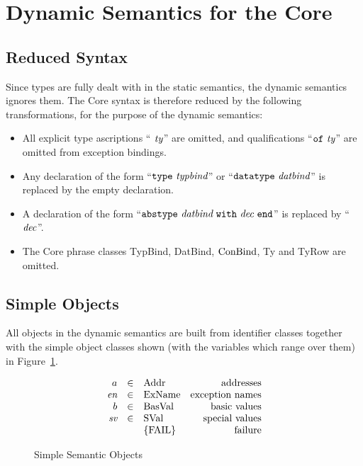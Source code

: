 \section{Dynamic Semantics for the Core}
\subsection{Reduced Syntax}
Since types are fully dealt with in the static semantics,
the dynamic semantics ignores them.  The Core syntax is therefore
reduced by the following transformations, for the purpose of the dynamic
semantics:
\begin{itemize}
\item All explicit type ascriptions ``\ml{:} ${\it ty}$'' are omitted, and
      qualifications ``${\tt of}\  {\it ty}$'' are omitted from exception
      bindings.
\item Any declaration of the form ``$\mbox{{\tt type}\ {\it typbind}}$'' or ``$\mbox{{\tt datatype}\ {\it datbind}}$''
      is replaced by the empty declaration.
\item A declaration of the form ``$\mbox{{\tt abstype}\ {\it datbind}\ {\tt with}\ {\it dec}\ {\tt end}}$'' is replaced by ``${\it dec}$''.
\item The Core phrase classes TypBind, DatBind, ${\rm ConBind}$, Ty and
      TyRow are omitted.
\end{itemize}

\subsection{Simple Objects}
All objects in the dynamic semantics are built from
identifier classes together with the simple object classes shown (with the
variables which range over them) in Figure~\ref{simp-dyn-obj}.

\begin{figure}[h]
\vspace{2pt}
\begin{displaymath}
\begin{array}{rclr}
a               & \in   & {\rm Addr}	& \mbox{addresses}\\
\mbox{\it en}               & \in   & {\rm ExName} 	& \mbox{exception names}\\
b      		& \in	& {\rm BasVal}	& \mbox{basic values}\\
\mbox{\it sv}             & \in   & {\rm SVal}         & \mbox{special values}\\
                &       & \{{\rm FAIL}\}     & \mbox{failure}\\   
\end{array}
\end{displaymath}
\caption{Simple Semantic Objects}
\label{simp-dyn-obj}
\vspace{3pt}
\end{figure}

